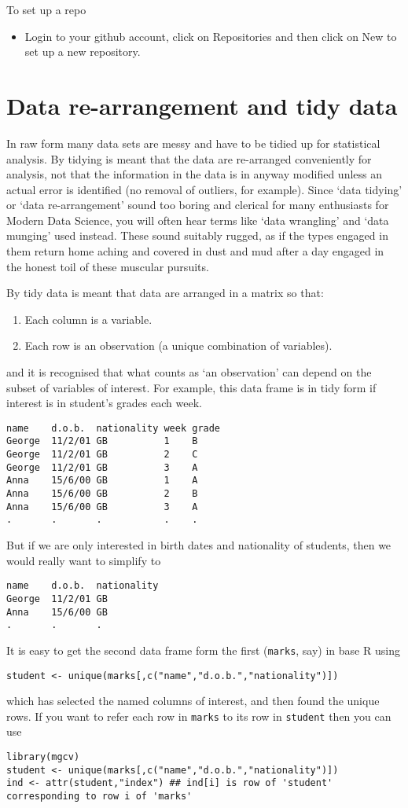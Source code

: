 \documentclass[10pt] {article}
\theoremstyle{definition}
\begin{document}
To set up a repo
\begin{itemize}
\item Login to your github account, click on Repositories and then click on New to set up a new repository.
\end{itemize}

\section{Data re-arrangement and tidy data}

In raw form many data sets are messy and have to be tidied up for statistical analysis. By tidying is meant that the data are re-arranged conveniently for analysis, not that the information in the data is in anyway modified unless an actual error is identified (no removal of outliers, for example). Since `data tidying' or `data re-arrangement' sound too boring and clerical for many enthusiasts for Modern Data Science, you will often hear terms like `data wrangling' and `data munging' used instead. These sound suitably rugged, as if the types engaged in them return home aching and covered in dust and mud after a day engaged in the honest toil of these muscular pursuits.

By tidy data is meant that data are arranged in a matrix so that:
\begin{enumerate}
\item Each column is a variable.
\item Each row is an observation (a unique combination of variables).
\end{enumerate}
and it is recognised that what counts as `an observation' can depend on the subset of variables of interest. For example,
this data frame is in tidy form if interest is in student's grades each week. 
\begin{verbatim}
name    d.o.b.  nationality week grade
George  11/2/01 GB          1    B
George  11/2/01 GB          2    C
George  11/2/01 GB          3    A
Anna    15/6/00 GB          1    A
Anna    15/6/00 GB          2    B
Anna    15/6/00 GB          3    A
.       .       .           .    .
\end{verbatim}
But if we are only interested in birth dates and nationality of students, then we would really want to simplify to
\begin{verbatim}
name    d.o.b.  nationality 
George  11/2/01 GB          
Anna    15/6/00 GB          
.       .       .           
\end{verbatim}
It is easy to get the second data frame form the first (\verb+marks+, say) in base R using
\begin{verbatim}
student <- unique(marks[,c("name","d.o.b.","nationality")])
\end{verbatim}
which has selected the named columns of interest, and then found the unique rows. If you want to refer each row in \verb+marks+ to its row in \verb+student+ then you can use 
\begin{verbatim}
library(mgcv)
student <- unique(marks[,c("name","d.o.b.","nationality")])
ind <- attr(student,"index") ## ind[i] is row of 'student' corresponding to row i of 'marks'
\end{verbatim}
\end{document}
